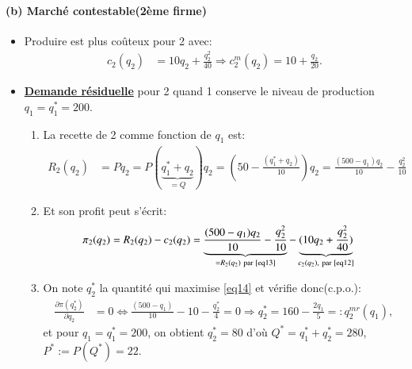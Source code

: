 \begin{frame}[allowframebreaks]{\insertsection}
\framesubtitle{(b) Marché contestable(2ème firme)}
    \begin{itemize}
        \item Produire est plus coûteux pour 2 avec: 
        \begin{align}
            c_2(q_2) &= 10q_2 + \frac{q_2^2}{40} \Rightarrow c^m_2(q_2) = 10 + \frac{q_2}{20}.
            \label{eq12}
        \end{align}
        \item  \textbf{\underline{Demande résiduelle}} pour 2 quand 1 conserve le niveau de production $q_1= q_1^* = 200$. 
        \begin{enumerate}[-]
            \item La recette de 2 comme fonction de $q_1$ est:
            \begin{align}
                R_2(q_2) &=Pq_2= P(\underbrace{q_1^* + q_2}_{=Q})q_2 = 
                \left(50 - \frac{(q_1^* + q_2)}{10}\right)q_2 = \frac{(500-q_1)q_2}{10} -\frac{q_2^2}{10}
                \label{eq13}
            \end{align}
            \item Et son profit peut s'écrit:  
            \begin{align}
                \pi_2(q_2) &= R_2(q_2) - c_2(q_2) = \underbrace{\frac{(500-q_1)q_2}{10} -\frac{q_2^2}{10}}_{=R_2(q_2) \ \text{par \eqref{eq13}}}
                - \underbrace{(10q_2 + \frac{q_2^2}{40})}_{c_2(q_2),  \ \text{par \eqref{eq12}}}
                \label{eq14}
            \end{align}
            \item On note $q_2^*$ la quantité qui maximise \eqref{eq14} et vérifie donc(c.p.o.):  
            \begin{align}
                \frac{\partial \pi(q_2^*)}{\partial q_2} &=0 \Leftrightarrow \frac{(500-q_1)}{10} - 10 -  \frac{q_2^*}{4} = 0
                 \Rightarrow q_2^* = 160 - \frac{2q_1}{5}=: q_2^{mr}(q_1),
                 \label{eq15}
            \end{align}
            et pour $q_1 = q_1^*=200$, on obtient $q_2^* = 80$ d'où  $Q^* = q_1^* + q_2^* = 280$, $P^* := P(Q^*) = 22$.
        \end{enumerate}
    \end{itemize}
\end{frame}   


